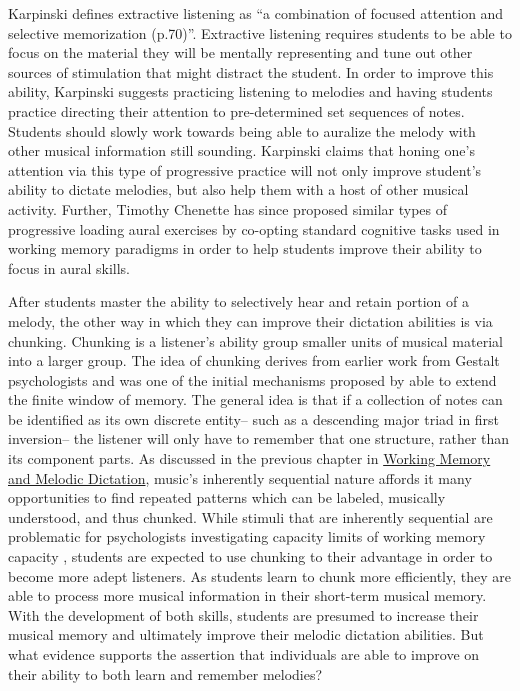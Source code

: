 \documentclass[]{book}
\begin{document}
Karpinski defines extractive listening as ``a combination of focused attention and selective memorization (p.70)''.
Extractive listening requires students to be able to focus on the material they will be mentally representing and tune out other sources of stimulation that might distract the student.
In order to improve this ability, Karpinski suggests practicing listening to melodies and having students practice directing their attention to pre-determined set sequences of notes.
Students should slowly work towards being able to auralize the melody with other musical information still sounding.
Karpinski claims that honing one's attention via this type of progressive practice will not only improve student's ability to dictate melodies, but also help them with a host of other musical activity.
Further, Timothy Chenette has since proposed similar types of progressive loading aural exercises by co-opting standard cognitive tasks used in working memory paradigms \citep{chenetteReframingAuralSkills2019} in order to help students improve their ability to focus in aural skills.

After students master the ability to selectively hear and retain portion of a melody, the other way in which they can improve their dictation abilities is via chunking.
Chunking is a listener's ability group smaller units of musical material into a larger group.
The idea of chunking derives from earlier work from Gestalt psychologists and was one of the initial mechanisms proposed by \citet{millerMagicalNumberSeven1956} able to extend the finite window of memory.
The general idea is that if a collection of notes can be identified as its own discrete entity-- such as a descending major triad in first inversion-- the listener will only have to remember that one structure, rather than its component parts.
As discussed in the previous chapter in \protect\hyperlink{working-memory-and-melodic-dictation}{Working Memory and Melodic Dictation}, music's inherently sequential nature affords it many opportunities to find repeated patterns which can be labeled, musically understood, and thus chunked.
While stimuli that are inherently sequential are problematic for psychologists investigating capacity limits of working memory capacity \citep{cowanWorkingMemoryCapacity2005}, students are expected to use chunking to their advantage in order to become more adept listeners.
As students learn to chunk more efficiently, they are able to process more musical information in their short-term musical memory.
With the development of both skills, students are presumed to increase their musical memory and ultimately improve their melodic dictation abilities.
But what evidence supports the assertion that individuals are able to improve on their ability to both learn and remember melodies?
\end{document}
